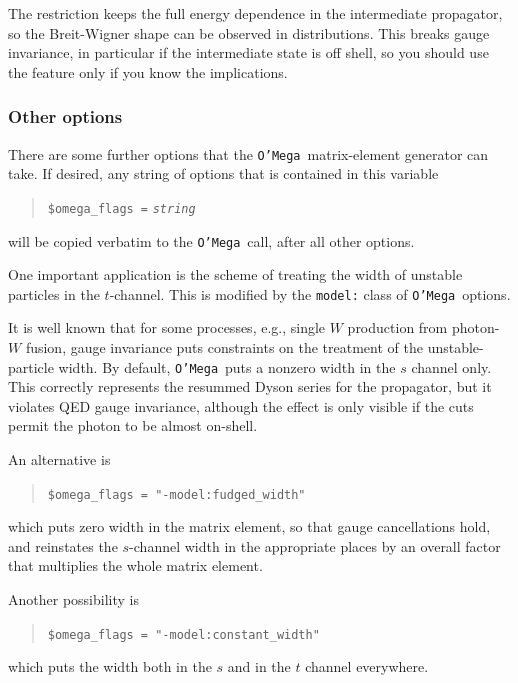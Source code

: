 \documentclass[12pt]{book}
\newcommand{\ttt}[1]{\texttt{#1}}
\newcommand{\oMega}{\texttt{O'Mega}}
\begin{document}
The restriction keeps the full energy dependence in the intermediate
propagator, so the Breit-Wigner shape can be observed in distributions.  This
breaks gauge invariance, in particular if the intermediate state is off shell,
so you should use the feature only if you know the implications.

\subsubsection{Other options}

There are some further options that the \oMega\ matrix-element generator can
take.  If desired, any string of options that is contained in this variable
\begin{quote}
\begin{footnotesize}
  \verb|$omega_flags =| \ttt{\textit{string}}
\end{footnotesize}
\end{quote}
will be copied verbatim to the \oMega\ call, after all other options.

One important application is the scheme of treating the width of unstable
particles in the $t$-channel.  This is modified by the \verb|model:| class of
\oMega\ options.

It is well known that for some processes, e.g., single $W$ production from
photon-$W$ fusion, gauge invariance puts constraints on the treatment of the
unstable-particle width.  By default, \oMega\ puts a nonzero width in the $s$
channel only.  This correctly represents the resummed Dyson series for the
propagator, but it violates QED gauge invariance, although the effect is only
visible if the cuts permit the photon to be almost on-shell.

An alternative is
\begin{quote}
\begin{footnotesize}
  \verb|$omega_flags = "-model:fudged_width"|
\end{footnotesize}
\end{quote}
which puts zero width in the matrix element, so that gauge cancellations
hold, and reinstates the $s$-channel width in the appropriate places by an
overall factor that multiplies the whole matrix element.

Another possibility is
\begin{quote}
\begin{footnotesize}
  \verb|$omega_flags = "-model:constant_width"|
\end{footnotesize}
\end{quote}
which puts the width both in the $s$ and in the $t$ channel everywhere.
\end{document}
